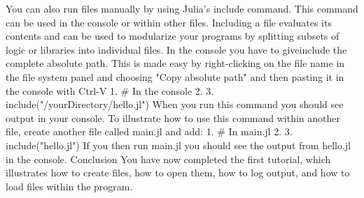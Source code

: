 You can also run files manually by using Julia's include command. This command can be used in the console or within other files. Including a file evaluates its contents and can be used to modularize your programs by splitting subsets of logic or libraries into individual files. In the console you have to giveinclude the complete absolute path. This is made easy by right-clicking on the file name in the file system panel and choosing "Copy absolute path" and then pasting it in the console with Ctrl-V
1.	# In the console
2.	 
3.	include("/yourDirectory/hello.jl")
When you run this command you should see output in your console.
To illustrate how to use this command within another file, create another file called main.jl and add:
1.	# In main.jl
2.	 
3.	include("hello.jl")
If you then run main.jl you should see the output from hello.jl in the console.
Conclusion
You have now completed the first tutorial, which illustrates how to create files, how to open them, how to log output, and how to load files within the program.


